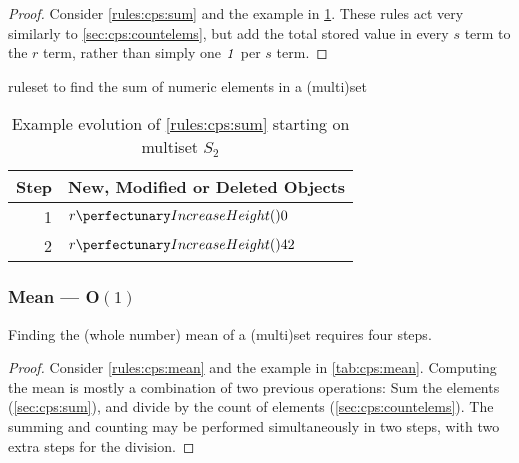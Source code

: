 \begin{proof}
Consider \cref{rules:cps:sum} and the example in \cref{tab:cps:sum}.  These rules act very similarly to \cref{sec:cps:countelems}, but add the total stored value in every \(s\) term to the \(r\) term, rather than simply one \(\mathit{1}\) per \(s\) term.
\end{proof}

\begin{cprulesetfloat} \begin{cpruleset}
\end{cpruleset}
\caption{\label{rules:cps:sum}\Gls{ruleset} to find the sum of numeric elements in a (multi)set}
\end{cprulesetfloat}

\begin{table} \centering
   \begin{tabular}{|r|l|}
    \hline
    \textbf{Step} & \textbf{New, Modified or Deleted Objects} \\ \hline
    1 & \(\cpfunc{r}{0}\)\\ \hline
    2 & \(\cpfunc{r}{42}\)\\ \hline

\end{tabular}
\caption[Example evolution of \cref{rules:cps:sum}]{\label{tab:cps:sum}Example evolution of \cref{rules:cps:sum} starting on multiset \(S_2\)}
\end{table}

\subsubsection{Mean --- O\((1)\)}\label{sec:cps:mean}

\begin{proposition}\label{prop:cps:mean}
Finding the (whole number) mean of a (multi)set requires four steps.
\end{proposition}

\begin{proof}
Consider \cref{rules:cps:mean} and the example in \cref{tab:cps:mean}.  Computing the mean is mostly a combination of two previous operations:  Sum the elements (\cref{sec:cps:sum}), and divide by the count of elements (\cref{sec:cps:countelems}).  The summing and counting may be performed simultaneously in two steps, with two extra steps for the division.
\end{proof}

